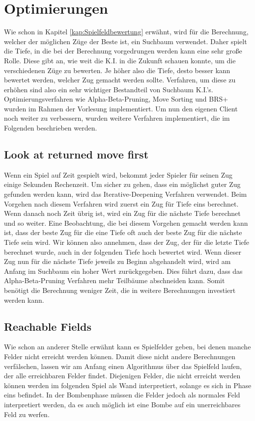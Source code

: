 \documentclass[12pt,a4paper,bibliography=totocnumbered,listof=totocnumbered]{article}
\begin{document}
\section{Optimierungen}
Wie schon in Kapitel \ref{kap:Spielfeldbewertung} erwähnt, wird für die Berechnung, welcher der möglichen Züge der Beste ist, ein Suchbaum verwendet. Daher spielt die Tiefe, in die bei der Berechnung vorgedrungen werden kann eine sehr große Rolle. Diese gibt an, wie weit die K.I. in die \glqq Zukunft\grqq{} schauen konnte, um die verschiedenen Züge zu bewerten. Je höher also die Tiefe, desto besser kann bewertet werden, welcher Zug gemacht werden sollte. Verfahren, um diese zu erhöhen sind also ein sehr wichtiger Bestandteil von Suchbaum K.I.'s. Optimierungsverfahren wie Alpha-Beta-Pruning, Move Sorting und BRS+ wurden im Rahmen der Vorlesung implementiert. Um nun den eigenen Client noch weiter zu verbessern, wurden weitere Verfahren implementiert, die im Folgenden beschrieben werden.

\subsection{Look at returned move first}
Wenn ein Spiel auf Zeit gespielt wird, bekommt jeder Spieler für seinen Zug einige Sekunden Rechenzeit. Um sicher zu gehen, dass ein möglichst guter Zug gefunden werden kann, wird das Iterative-Deepening Verfahren verwendet. Beim Vorgehen nach diesem Verfahren wird zuerst ein Zug für Tiefe eins berechnet. Wenn danach noch Zeit übrig ist, wird ein Zug für die nächste Tiefe berechnet und so weiter. Eine Beobachtung, die bei diesem Vorgehen gemacht werden kann ist, dass der beste Zug für die eine Tiefe oft auch der beste Zug für die nächste Tiefe sein wird. Wir können also annehmen, dass der Zug, der für die letzte Tiefe berechnet wurde, auch in der folgenden Tiefe hoch bewertet wird. Wenn dieser Zug nun für die nächste Tiefe jeweils zu Beginn abgehandelt wird, wird am Anfang im Suchbaum ein hoher Wert zurückgegeben. Dies führt dazu, dass das Alpha-Beta-Pruning Verfahren mehr Teilbäume abschneiden kann. Somit benötigt die Berechnung weniger Zeit, die in weitere Berechnungen investiert werden kann.

\subsection{Reachable Fields}
Wie schon an anderer Stelle erwähnt kann es Spielfelder geben, bei denen manche Felder nicht erreicht werden können. Damit diese nicht andere Berechnungen verfälschen, lassen wir am Anfang einen Algorithmus über das Spielfeld laufen, der alle erreichbaren Felder findet. Diejenigen Felder, die nicht erreicht werden können werden im folgenden Spiel als Wand interpretiert, solange es sich in Phase eins befindet. In der Bombenphase müssen die Felder jedoch als normales Feld interpretiert werden, da es auch möglich ist eine Bombe auf ein unerreichbares Feld zu werfen.
\end{document}
